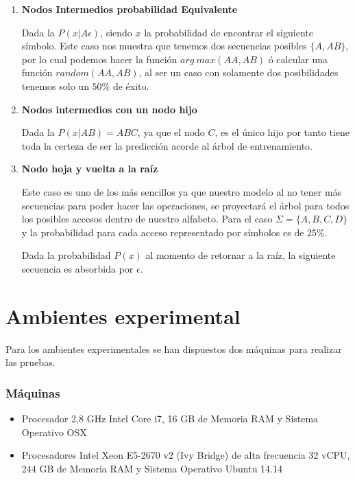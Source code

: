 \begin{enumerate}
	\item \textbf{Nodos Intermedios probabilidad Equivalente}
	
	Dada la $P( x | A\epsilon  )$, siendo $x$ la probabilidad de encontrar el siguiente símbolo. Este caso nos muestra que tenemos dos secuencias posibles $\{A,AB\}$, por lo cual podemos hacer la función $arg\ max(AA,AB)$ ó calcular una función $random(AA,AB)$, al ser un caso con solamente dos posibilidades tenemos solo un $50\%$ de éxito.
	
	
	\item \textbf{Nodos intermedios con un nodo hijo }
	
	Dada la $P( x | AB  )  = ABC$, ya que  el nodo $C$, es el único hijo por tanto tiene toda la certeza de ser la predicción acorde al árbol de entrenamiento.
		
		
		
	\item \textbf{Nodo hoja y vuelta a la raíz}	
	
	Este caso es uno de los más sencillos ya que nuestro modelo al no tener más secuencias para poder hacer las operaciones, se proyectará el árbol para todos los posibles accesos dentro de nuestro alfabeto. Para el caso $\Sigma = \{A,B,C,D \} $ y la probabilidad para cada acceso representado por símbolos es de $25\%$.
	
	
	Dada la probabilidad $P( x ) $ al momento de retornar a la raíz, la siguiente secuencia es absorbida por $\epsilon$.
	

\end{enumerate}







\section{Ambientes experimental}

Para los ambientes experimentales se han dispuestos dos máquinas para realizar las pruebas. 

\subsubsection{Máquinas}
	\begin{itemize}
		\menorEspacioItemize
		\item Procesador 2,8 GHz Intel Core i7, 16 GB de Memoria RAM y Sistema Operativo OSX
		\item Procesadores Intel Xeon E5-2670 v2 (Ivy Bridge) de alta frecuencia 32 vCPU, 244 GB de Memoria RAM y Sistema Operativo Ubuntu 14.14 
	\end{itemize}
	
